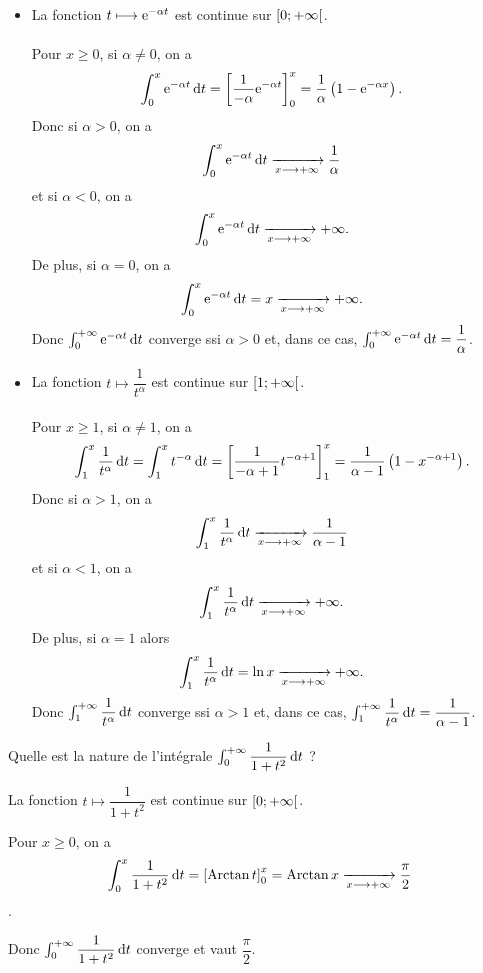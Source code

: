 \begin{dem}
\begin{itemize}
    \item La fonction \(t\longmapsto\mathrm{e}^{-\alpha t}\) est continue sur \(\left[0;+\infty\right[\). \\\\ Pour \(x\geq0\), si \(\alpha\not=0\), on a \[\int_0^x\e{-\alpha t}\odif{t}=\croch{\dfrac{1}{-\alpha}\e{-\alpha t}}_0^x=\dfrac{1}{\alpha}\paren{1-\e{-\alpha x}}.\] Donc si \(\alpha>0\), on a \[\int_0^x\e{-\alpha t}\odif{t}\tendqd{x\to\pinf}\dfrac{1}{\alpha}\] et si \(\alpha<0\), on a \[\int_0^x\e{-\alpha t}\odif{t}\tendqd{x\to\pinf}\pinf.\] De plus, si \(\alpha=0\), on a \[\int_0^x\e{-\alpha t}\odif{t}=x\tendqd{x\to\pinf}\pinf.\] Donc \(\int_0^{\pinf}\e{-\alpha t}\odif{t}\) converge ssi \(\alpha>0\) et, dans ce cas, \(\int_0^{\pinf}\e{-\alpha t}\odif{t}=\dfrac{1}{\alpha}\). \\
    \item La fonction \(t\mapsto\dfrac{1}{t^\alpha}\) est continue sur \(\left[1;+\infty\right[\). \\\\ Pour \(x\geq1\), si \(\alpha\not=1\), on a \[\int_1^x\dfrac{1}{t^\alpha}\odif{t}=\int_1^xt^{-\alpha}\odif{t}=\croch{\dfrac{1}{-\alpha+1}t^{-\alpha+1}}_1^x=\dfrac{1}{\alpha-1}\paren{1-x^{-\alpha+1}}.\] Donc si \(\alpha>1\), on a \[\int_1^x\dfrac{1}{t^\alpha}\odif{t}\tendqd{x\to\pinf}\dfrac{1}{\alpha-1}\] et si \(\alpha<1\), on a \[\int_1^x\dfrac{1}{t^\alpha}\odif{t}\tendqd{x\to\pinf}\pinf.\] De plus, si \(\alpha=1\) alors \[\int_1^x\dfrac{1}{t^\alpha}\odif{t}=\ln x\tendqd{x\to\pinf}\pinf.\] Donc \(\int_1^{\pinf}\dfrac{1}{t^\alpha}\odif{t}\) converge ssi \(\alpha>1\) et, dans ce cas, \(\int_1^{\pinf}\dfrac{1}{t^\alpha}\odif{t}=\dfrac{1}{\alpha-1}\).
\end{itemize}
\end{dem}

\begin{exo}
Quelle est la nature de l'intégrale \(\int_0^{\pinf}\dfrac{1}{1+t^2}\odif{t}\) ?
\end{exo}

\begin{corr}
La fonction \(t\mapsto\dfrac{1}{1+t^2}\) est continue sur \(\left[0;+\infty\right[\).

Pour \(x\geq0\), on a \[\int_0^x\dfrac{1}{1+t^2}\odif{t}=\croch{\Arctan t}_0^x=\Arctan x\tendqd{x\to\pinf}\dfrac{\pi}{2}\].

Donc \(\int_0^{\pinf}\dfrac{1}{1+t^2}\odif{t}\) converge et vaut \(\dfrac{\pi}{2}\).
\end{corr}


